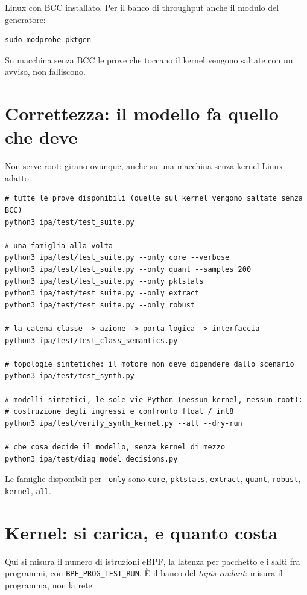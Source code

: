 \documentclass[11pt,a4paper,oneside]{report}
\begin{document}
\begin{prima}[Prerequisiti]
Linux con BCC installato. Per il banco di throughput anche il modulo del
generatore:
\begin{lstlisting}
sudo modprobe pktgen
\end{lstlisting}
Su macchina senza BCC le prove che toccano il kernel vengono saltate con un
avviso, non falliscono.
\end{prima}

\section{Correttezza: il modello fa quello che deve}

Non serve root: girano ovunque, anche su una macchina senza kernel Linux
adatto.

\begin{lstlisting}
# tutte le prove disponibili (quelle sul kernel vengono saltate senza BCC)
python3 ipa/test/test_suite.py

# una famiglia alla volta
python3 ipa/test/test_suite.py --only core --verbose
python3 ipa/test/test_suite.py --only quant --samples 200
python3 ipa/test/test_suite.py --only pktstats
python3 ipa/test/test_suite.py --only extract
python3 ipa/test/test_suite.py --only robust

# la catena classe -> azione -> porta logica -> interfaccia
python3 ipa/test/test_class_semantics.py

# topologie sintetiche: il motore non deve dipendere dallo scenario
python3 ipa/test/test_synth.py

# modelli sintetici, le sole vie Python (nessun kernel, nessun root):
# costruzione degli ingressi e confronto float / int8
python3 ipa/test/verify_synth_kernel.py --all --dry-run

# che cosa decide il modello, senza kernel di mezzo
python3 ipa/test/diag_model_decisions.py
\end{lstlisting}

Le famiglie disponibili per \texttt{--only} sono \texttt{core},
\texttt{pktstats}, \texttt{extract}, \texttt{quant}, \texttt{robust},
\texttt{kernel}, \texttt{all}.

\section{Kernel: si carica, e quanto costa}

Qui si misura il numero di istruzioni eBPF, la latenza per pacchetto e i salti
fra programmi, con \texttt{BPF\_PROG\_TEST\_RUN}. È il banco del
\emph{tapis roulant}: misura il programma, non la rete.
\end{document}

